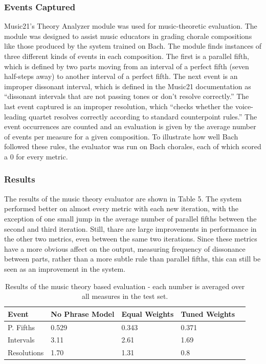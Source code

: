 \documentclass{sig-alternate}
\begin{document}
\subsubsection{Events Captured}
Music21's Theory Analyzer module \cite{Cuthbert_music21:a} was used for music-theoretic evaluation. The module was designed to assist music educators in grading chorale compositions like those produced by the system trained on Bach. The module finds instances of three different kinds of events in each composition. The first is a parallel fifth, which is defined by two parts moving from an interval of a perfect fifth (seven half-steps away) to another interval of a perfect fifth. The next event is an improper dissonant interval, which is defined in the Music21 documentation as ``dissonant intervals that are not passing tones or don't resolve correctly.'' The last event captured is an improper resolution, which ``checks whether the voice-leading quartet resolves correctly according to standard counterpoint rules.'' The event occurrences are counted and an evaluation is given by the average number of events per measure for a given composition. To illustrate how well Bach followed these rules, the evaluator was run on Bach chorales, each of which scored a 0 for every metric. 

\subsubsection{Results}
The results of the music theory evaluator are shown in Table 5. The system performed better on almost every metric with each new iteration, with the exception of one small jump in the average number of parallel fifths between the second and third iteration. Still, thare are large improvements in performance in the other two metrics, even between the same two iterations. Since these metrics have a more obvious affect on the output, measuring frequency of dissonance between parts, rather than a more subtle rule than parallel fifths, this can still be seen as an improvement in the system.

\begin{table}
	\begin{tabular}{| l | l | l | l | l |}
	\hline
	Event & No Phrase Model & Equal Weights & Tuned Weights \\ \hline
	P. Fifths & 0.529 & 0.343 & 0.371 \\
	Intervals & 3.11 & 2.61 & 1.69 \\
	Resolutions & 1.70 & 1.31 & 0.8 \\ \hline
	\end{tabular}
	\caption{Results of the music theory based evaluation - each number is averaged over all measures in the test set.}
\end{table}
\end{document}

